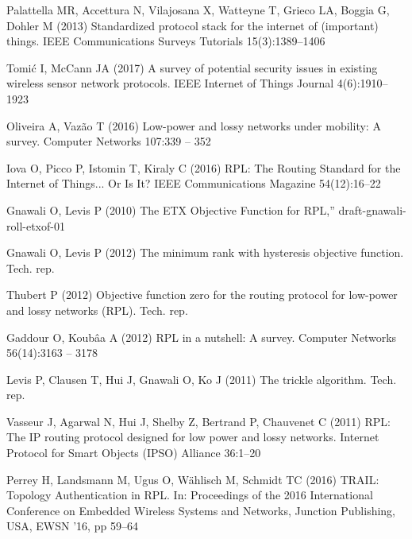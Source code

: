 \documentclass[]{svjour3}                     %
\begin{document}
\begin{thebibliography}{57}
	Palattella MR, Accettura N, Vilajosana X, Watteyne T, Grieco LA, Boggia G,
	Dohler M (2013) Standardized protocol stack for the internet of (important)
	things. IEEE Communications Surveys Tutorials 15(3):1389--1406
	
	Tomić I, McCann JA (2017) A survey of potential security issues in existing
	wireless sensor network protocols. IEEE Internet of Things Journal
	4(6):1910--1923
	
	Oliveira A, Vazão T (2016) Low-power and lossy networks under mobility: A
	survey. Computer Networks 107:339 -- 352
	
	Iova O, Picco P, Istomin T, Kiraly C (2016) {RPL: The Routing Standard for the
		Internet of Things... Or Is It?} IEEE Communications Magazine 54(12):16--22
	
	Gnawali O, Levis P (2010) {The ETX Objective Function for RPL,”
		draft-gnawali-roll-etxof-01}
	
	Gnawali O, Levis P (2012) {The minimum rank with hysteresis objective
		function}. Tech. rep.
	
	Thubert P (2012) {Objective function zero for the routing protocol for
		low-power and lossy networks (RPL)}. Tech. rep.
	
	Gaddour O, Koubâa A (2012) {RPL in a nutshell: A survey}. Computer Networks
	56(14):3163 -- 3178
	
	Levis P, Clausen T, Hui J, Gnawali O, Ko J (2011) The trickle algorithm. Tech.
	rep.
	
	Vasseur J, Agarwal N, Hui J, Shelby Z, Bertrand P, Chauvenet C (2011) {RPL: The
		IP routing protocol designed for low power and lossy networks}. Internet
	Protocol for Smart Objects (IPSO) Alliance 36:1--20
	
	Perrey H, Landsmann M, Ugus O, W\"{a}hlisch M, Schmidt TC (2016) {TRAIL:
		Topology Authentication in RPL}. In: Proceedings of the 2016 International
	Conference on Embedded Wireless Systems and Networks, Junction Publishing,
	USA, EWSN '16, pp 59--64
	

\end{thebibliography}
\end{document}
